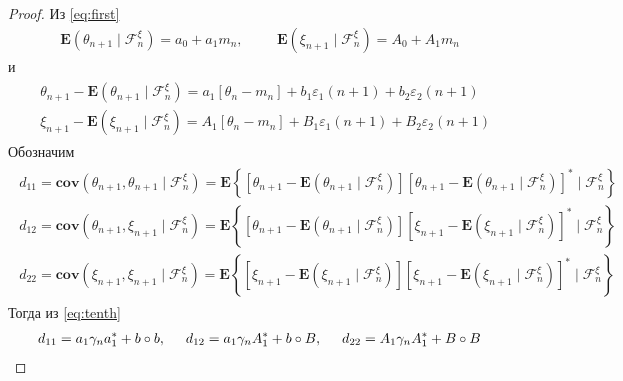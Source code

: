 \begin{proof}
	Из \eqref{eq:first}
	\begin{gather}
	\label{eq:ninth}
	\mathbf{E}\left(\theta_{n + 1} \mid \mathscr{F}^\xi_n\right) = a_0 + a_1 m_n, \hspace{1cm} \mathbf{E}\left(\xi_{n + 1} \mid \mathscr{F}^\xi_n\right) = A_0 + A_1 m_n
	\end{gather}
	и
	\begin{align}
	\label{eq:tenth}
	\begin{split}
	& \theta_{n + 1} - \mathbf{E}\left(\theta_{n + 1} \mid \mathscr{F}^\xi_n\right) = a_1 \left[\theta_n - m_n \right] + b_1 \varepsilon_1 (n + 1) + b_2 \varepsilon_2 (n + 1)\\
	& \xi_{n + 1} - \mathbf{E}\left(\xi_{n + 1} \mid \mathscr{F}^\xi_n\right) = A_1 \left[\theta_n - m_n \right] + B_1 \varepsilon_1 (n + 1) + B_2 \varepsilon_2 (n + 1)
	\end{split}
	\end{align}
	Обозначим
	\begin{align*}
	\begin{split}
	d_{11} = \mathbf{cov}\left(\theta_{n + 1}, \theta_{n + 1} \mid \mathscr{F}^\xi_n\right) = \mathbf{E}\left\{\left[\theta_{n + 1} - \mathbf{E}\left(\theta_{n + 1} \mid \mathscr{F}^\xi_n\right)\right] \left[\theta_{n + 1} - \mathbf{E}\left(\theta_{n + 1} \mid \mathscr{F}^\xi_n\right) \right]^* \mid \mathscr{F}^\xi_n\right\} \\
	d_{12} = \mathbf{cov}\left(\theta_{n + 1}, \xi_{n + 1} \mid \mathscr{F}^\xi_n\right) = \mathbf{E}\left\{\left[\theta_{n + 1} - \mathbf{E}\left(\theta_{n + 1} \mid \mathscr{F}^\xi_n\right)\right] \left[\xi_{n + 1} - \mathbf{E}\left(\xi_{n + 1} \mid \mathscr{F}^\xi_n\right) \right]^* \mid \mathscr{F}^\xi_n\right\} \\
	d_{22} = \mathbf{cov}\left(\xi_{n + 1}, \xi_{n + 1} \mid \mathscr{F}^\xi_n\right) = \mathbf{E}\left\{\left[\xi_{n + 1} - \mathbf{E}\left(\xi_{n + 1} \mid \mathscr{F}^\xi_n\right)\right] \left[\xi_{n + 1} - \mathbf{E}\left(\xi_{n + 1} \mid \mathscr{F}^\xi_n\right) \right]^* \mid \mathscr{F}^\xi_n\right\}
	\end{split}
	\end{align*}
	Тогда из \eqref{eq:tenth}
	\begin{align}
	\label{eq:eleventh}
	d_{11} = a_1 \gamma_n a^*_1 + b \circ b, \hspace{0.5cm} d_{12} = a_1 \gamma_n A^*_1 + b \circ B, \hspace{0.5cm} d_{22} = A_1 \gamma_n A^*_1 + B \circ B
	\end{align}
	

\end{proof}
